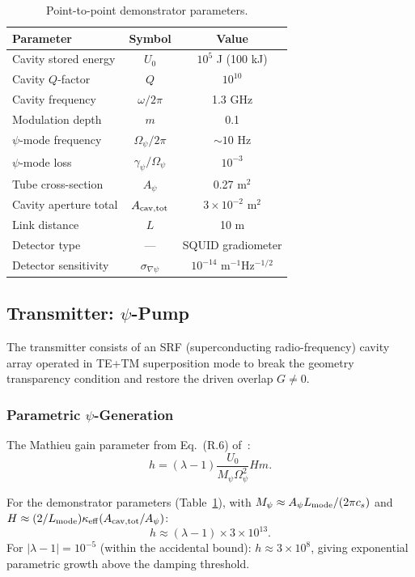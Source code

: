 \documentclass[twocolumn,superscriptaddress,prd,nofootinbib]{revtex4-2}
\begin{document}
\begin{table}[h]
\caption{Point-to-point demonstrator parameters.}
\label{tab:demonstrator}
\begin{ruledtabular}
\begin{tabular}{lcc}
Parameter & Symbol & Value \\
\hline
Cavity stored energy & $U_0$ & $10^5$ J (100 kJ) \\
Cavity $Q$-factor & $Q$ & $10^{10}$ \\
Cavity frequency & $\omega/2\pi$ & 1.3 GHz \\
Modulation depth & $m$ & 0.1 \\
$\psi$-mode frequency & $\Omega_\psi/2\pi$ & $\sim 10$ Hz \\
$\psi$-mode loss & $\gamma_\psi/\Omega_\psi$ & $10^{-3}$ \\
Tube cross-section & $A_\psi$ & 0.27 m$^2$ \\
Cavity aperture total & $A_{\rm cav,tot}$ & $3 \times 10^{-2}$ m$^2$ \\
Link distance & $L$ & 10 m \\
Detector type & --- & SQUID gradiometer \\
Detector sensitivity & $\sigma_{\nabla\psi}$ & $10^{-14}$ m$^{-1}$Hz$^{-1/2}$ \\
\end{tabular}
\end{ruledtabular}
\end{table}

\subsection{Transmitter: $\psi$-Pump}

The transmitter consists of an SRF (superconducting radio-frequency)
cavity array operated in TE+TM superposition mode to break the geometry
transparency condition and restore the driven overlap $G \neq 0$.

\subsubsection{Parametric $\psi$-Generation}

The Mathieu gain parameter from Eq.~(R.6) of~\cite{Alcock2025DFD}:
\begin{equation}
h = (\lambda - 1)\frac{U_0}{M_\psi \Omega_\psi^2}Hm.
\label{eq:Mathieu-gain}
\end{equation}

For the demonstrator parameters (Table~\ref{tab:demonstrator}), with
$M_\psi \approx A_\psi L_{\rm mode} / (2\pi c_s)$ and
$H \approx (2/L_{\rm mode})\kappa_{\rm eff}(A_{\rm cav,tot}/A_\psi)$:
\begin{equation}
h \approx (\lambda - 1) \times 3 \times 10^{13}.
\label{eq:h-value}
\end{equation}
For $|\lambda - 1| = 10^{-5}$ (within the accidental bound):
$h \approx 3 \times 10^8$, giving exponential parametric growth above
the damping threshold.
\end{document}
